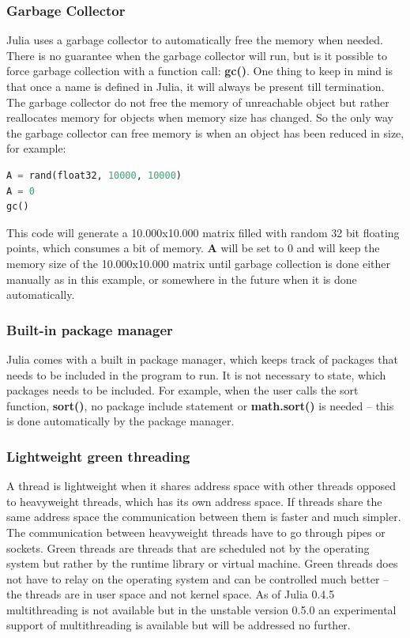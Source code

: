 \documentclass[a4paper, 11pt, titlepage]{article}
\begin{document}
\subsubsection{Garbage Collector}
Julia uses a garbage collector to automatically free the memory when needed. There is no guarantee when the garbage collector will run, but is it possible to force garbage collection with a function call: \textbf{gc()}. One thing to keep in mind is that once a name is defined in Julia, it will always be present till termination. The garbage collector do not free the memory of unreachable object but rather reallocates memory for objects when memory size has changed. So the only way the garbage collector can free memory is when an object has been reduced in size, for example:

\begin{lstlisting}[language=python]
A = rand(float32, 10000, 10000) 
A = 0
gc() 
\end{lstlisting}
This code will generate a 10.000x10.000 matrix filled with random 32 bit floating points, which consumes a bit of memory. \textbf{A} will be set to 0 and will keep the memory size of the 10.000x10.000 matrix until garbage collection is done either manually as in this example, or somewhere in the future when it is done automatically. 

\subsubsection{Built-in package manager}
Julia comes with a built in package manager, which keeps track of packages that needs to be included in the program to run. It is not necessary to state, which packages needs to be included. For example, when the user calls the sort function, \textbf{sort()}, no package include statement or \textbf{math.sort()} is needed – this is done automatically by the package manager.

\subsubsection{Lightweight green threading}
A thread is lightweight when it shares address space with other threads opposed to heavyweight threads, which has its own address space. If threads share the same address space the communication between them is faster and much simpler. The communication between heavyweight threads have to go through pipes or sockets. Green threads are threads that are scheduled not by the operating system but rather by the runtime library or virtual machine. Green threads does not have to relay on the operating system and can be controlled much better – the threads are in user space and not kernel space. As of Julia 0.4.5 multithreading is not available but in the unstable version 0.5.0 an experimental support of multithreading is available but will be addressed no further. 
\end{document}
